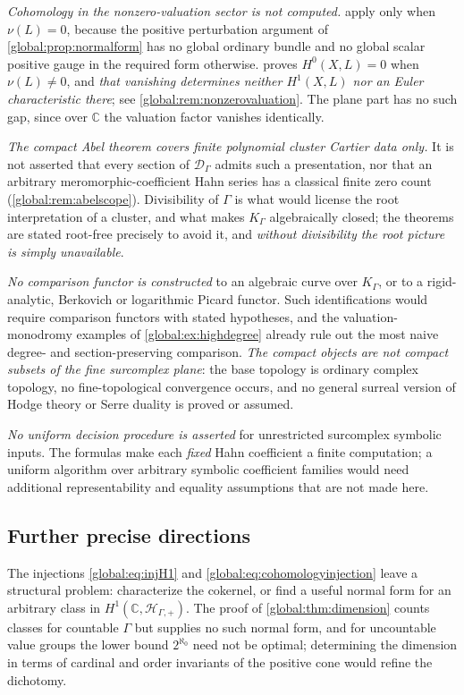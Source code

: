 \documentclass[11pt,letterpaper]{article}
\theoremstyle{definition}
\theoremstyle{remark}
\newcommand{\C}{\mathbb C}
\newcommand{\HP}{\mathscr H_{\Gamma,+}}
\newcommand{\KK}{K_\Gamma}
\newcommand{\DG}{\mathscr D_\Gamma}
\numberwithin{equation}{section}
\begin{document}
\emph{Cohomology in the nonzero-valuation sector is not computed.}  apply only when $\nu(L)=0$, because the positive perturbation argument of \cref{global:prop:normalform} has no global ordinary bundle and no global scalar positive gauge in the required form otherwise.  proves $H^0(X,L)=0$ when $\nu(L)\ne0$, and \emph{that vanishing determines neither $H^1(X,L)$ nor an Euler characteristic there}; see \cref{global:rem:nonzerovaluation}. The plane part has no such gap, since over $\C$ the valuation factor vanishes identically.

\emph{The compact Abel theorem covers finite polynomial cluster Cartier data only.} It is not asserted that every section of $\DG$ admits such a presentation, nor that an arbitrary meromorphic-coefficient Hahn series has a classical finite zero count (\cref{global:rem:abelscope}). Divisibility of $\Gamma$ is what would license the root interpretation of a cluster, and what makes $\KK$ algebraically closed; the theorems are stated root-free precisely to avoid it, and \emph{without divisibility the root picture is simply unavailable}.

\emph{No comparison functor is constructed} to an algebraic curve over $\KK$, or to a rigid-analytic, Berkovich or logarithmic Picard functor. Such identifications would require comparison functors with stated hypotheses, and the valuation-monodromy examples of \cref{global:ex:highdegree} already rule out the most naive degree- and section-preserving comparison. \emph{The compact objects are not compact subsets of the fine surcomplex plane}: the base topology is ordinary complex topology, no fine-topological convergence occurs, and no general surreal version of Hodge theory or Serre duality is proved or assumed.

\emph{No uniform decision procedure is asserted} for unrestricted surcomplex symbolic inputs. The formulas make each \emph{fixed} Hahn coefficient a finite computation; a uniform algorithm over arbitrary symbolic coefficient families would need additional representability and equality assumptions that are not made here.

\subsection{Further precise directions}

The injections \eqref{global:eq:injH1} and \eqref{global:eq:cohomologyinjection} leave a structural problem: characterize the cokernel, or find a useful normal form for an arbitrary class in $H^1(\C,\HP)$. The proof of \cref{global:thm:dimension} counts classes for countable $\Gamma$ but supplies no such normal form, and for uncountable value groups the lower bound $2^{\aleph_0}$ need not be optimal; determining the dimension in terms of cardinal and order invariants of the positive cone would refine the dichotomy.
\end{document}
